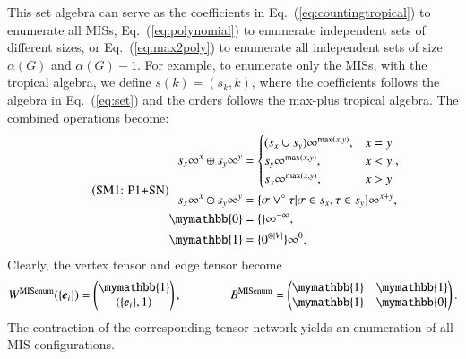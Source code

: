 \documentclass[onefignum, onetabnum]{siamart190516}
\newcommand{\eqname}[1]{\stepcounter{equation}\tag{\theequation : #1}}
\newcommand{\<}{\langle}
\renewcommand{\>}{\rangle}
\newcommand{\Eq}[1]{Eq.~(\ref{#1})}
\newcounter{example}
\begin{document}
This set algebra can serve as the coefficients in \Eq{eq:countingtropical} to enumerate all MISs, \Eq{eq:polynomial} to enumerate independent sets of different sizes,
or \Eq{eq:max2poly} to enumerate all independent sets of size $\alpha(G)$ and $\alpha(G)-1$.
For example, to enumerate only the MISs, with the tropical algebra, we define $s(k) = (s_{k}, k)$, where the coefficients follows the algebra in \Eq{eq:set} and the orders follows the max-plus tropical algebra.
The combined operations become: 
\begin{equation}
\eqname{P1+SN}
\begin{split}
    s_x\infty^x \oplus s_y\infty^y &= \begin{cases}
        (s_x \cup s_y)\infty^{\max(x,y)}, & x = y\\
        s_y\infty^{\max(x,y)}, & x < y\\
        s_x\infty^{\max(x,y)}, & x > y
    \end{cases},\\
    s_x\infty^x \odot s_y\infty^y &= \{\sigma \lor^\circ \tau | \sigma \in s_x, \tau \in s_y\}\infty^{x+y},\\
    \mymathbb{0} &= \{\}\infty^{-\infty},\\
    \mymathbb{1} &= \{0^{\otimes |V|}\}\infty^{0}. \label{eq:countingtropicalset}
\end{split}
\end{equation}
Clearly, the vertex tensor and edge tensor become
\begin{equation}
    W^{\rm MISenum}(\{\boldsymbol{e}_{i}\}) = \left(\begin{matrix}
        \mymathbb{1} \\
        \left({\{\boldsymbol{e}_{i}\}, 1} \right)
    \end{matrix}\right),   
    \qquad \qquad
        B^{\rm MISenum} = \left(\begin{matrix}
        \mymathbb{1}  & \mymathbb{1} \\
        \mymathbb{1} & \mymathbb{0}
    \end{matrix}\right).
\end{equation}
The contraction of the corresponding tensor network yields an enumeration of all MIS configurations.
\end{document}
